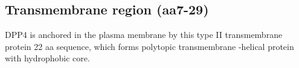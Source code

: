 \subsection{Transmembrane region (aa7-29)}

DPP4 is anchored in the plasma membrane by this type II transmembrane protein 22 aa sequence, which forms polytopic transmembrane \alpha-helical protein with hydrophobic core.~\cite{Hong_1990}